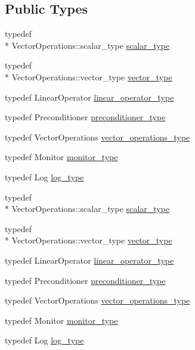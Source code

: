 \subsection*{Public Types}
\begin{DoxyCompactItemize}
\item 
typedef \\*
Vector\-Operations\-::scalar\-\_\-type \hyperlink{classnumerical__algos_1_1lin__solvers_1_1bicgstab_a051c0387d2b7f9c86883a0e612291876}{scalar\-\_\-type}
\item 
typedef \\*
Vector\-Operations\-::vector\-\_\-type \hyperlink{classnumerical__algos_1_1lin__solvers_1_1bicgstab_a3525de8fe1598864ceac98c83bd0d477}{vector\-\_\-type}
\item 
typedef Linear\-Operator \hyperlink{classnumerical__algos_1_1lin__solvers_1_1bicgstab_a77f7bc99b7f22986f73ce7d2b4ebd669}{linear\-\_\-operator\-\_\-type}
\item 
typedef Preconditioner \hyperlink{classnumerical__algos_1_1lin__solvers_1_1bicgstab_a70df69cdff2a33dea49471b873ca91af}{preconditioner\-\_\-type}
\item 
typedef Vector\-Operations \hyperlink{classnumerical__algos_1_1lin__solvers_1_1bicgstab_a6ff5c085063b744de8b72fd42bd45f33}{vector\-\_\-operations\-\_\-type}
\item 
typedef Monitor \hyperlink{classnumerical__algos_1_1lin__solvers_1_1bicgstab_a5837507942b23f73613452c79032b795}{monitor\-\_\-type}
\item 
typedef Log \hyperlink{classnumerical__algos_1_1lin__solvers_1_1bicgstab_a89196ef8d314663bd606395a4c8a6cc1}{log\-\_\-type}
\item 
typedef \\*
Vector\-Operations\-::scalar\-\_\-type \hyperlink{classnumerical__algos_1_1lin__solvers_1_1bicgstab_a051c0387d2b7f9c86883a0e612291876}{scalar\-\_\-type}
\item 
typedef \\*
Vector\-Operations\-::vector\-\_\-type \hyperlink{classnumerical__algos_1_1lin__solvers_1_1bicgstab_a3525de8fe1598864ceac98c83bd0d477}{vector\-\_\-type}
\item 
typedef Linear\-Operator \hyperlink{classnumerical__algos_1_1lin__solvers_1_1bicgstab_a77f7bc99b7f22986f73ce7d2b4ebd669}{linear\-\_\-operator\-\_\-type}
\item 
typedef Preconditioner \hyperlink{classnumerical__algos_1_1lin__solvers_1_1bicgstab_a70df69cdff2a33dea49471b873ca91af}{preconditioner\-\_\-type}
\item 
typedef Vector\-Operations \hyperlink{classnumerical__algos_1_1lin__solvers_1_1bicgstab_a6ff5c085063b744de8b72fd42bd45f33}{vector\-\_\-operations\-\_\-type}
\item 
typedef Monitor \hyperlink{classnumerical__algos_1_1lin__solvers_1_1bicgstab_a5837507942b23f73613452c79032b795}{monitor\-\_\-type}
\item 
typedef Log \hyperlink{classnumerical__algos_1_1lin__solvers_1_1bicgstab_a89196ef8d314663bd606395a4c8a6cc1}{log\-\_\-type}
\end{DoxyCompactItemize}
